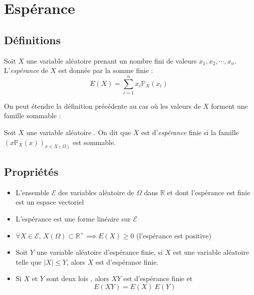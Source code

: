 \documentclass[11pt,a4paper,fleqn,pdftex]{report}
\begin{document}
\section{Espérance} %
\label{sec:esperance}
\subsection{Définitions} %
\label{sub:esperance_definitions}
\begin{dfn}
     Soit $X$ une variable aléatoire prenant un nombre fini de valeurs $x_1, x_2, \cdots , x_n$. L'\emph{espérance} de $X$ est donnée par la somme finie :
     \begin{equation}
     E(X) = \sum_{i=1}^n x_i \mathbb{P}_X(x_i)
     \end{equation}
\end{dfn}
On peut étendre la définition précédente au cas où les valeurs de $X$ forment une famille sommable :
\begin{dfn}
     Soit $X$ une variable aléatoire . On dit que $X$ est d'\emph{espérance} finie si la famille $\left( x\mathbb{P}_X(x)\right)_{x\in X(\Omega)}$ est sommable.
\end{dfn}
\subsection{Propriétés} %
\label{sub:esperance_proprietes}
\begin{prop}
     \begin{itemize}
         \item L'ensemble $\mathscr{E}$ des variables aléatoire de $\Omega$ dans $\mathbb{R}$ et dont l'espérance est finie est un espace vectoriel
         \item L'espérance est une forme linéaire sur $\mathscr{E}$
         \item $\forall X \in \mathscr{E},\, X(\Omega) \subset \mathbb{R}^+ \implies E(X) \ge 0$ (l'espérance est positive)
         \item Soit $Y$ une variable aléatoire d'espérance finie, si $X$ est une variable aléatoire telle que $|X| \le Y$, alors $X$ est d'espérance finie.
         \item Si $X$ et $Y$ sont deux lois  , alors $XY$ est d'espérance finie et 
         \begin{equation*}
         E(XY) = E(X)\: E(Y)
         \end{equation*}
     \end{itemize}
\end{prop}
\end{document}
